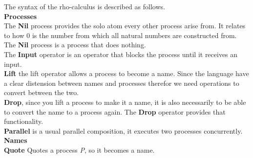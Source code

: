 The syntax of the rho-calculus is described as follows.\\





\textbf{Processes}\\ %
The \textbf{Nil} process provides the solo atom every other process arise from. It relates to how 0 is the number from which all natural numbers are constructed from. The \textbf{Nil} process is a process that does nothing.\\
The \textbf{Input} operator is an operator that blocks the process until it receives an input.\\
\textbf{Lift} the lift operator allows a process to become a name. Since the language have a clear distension between names and processes therefor we need operations to convert between the two.\\
\textbf{Drop}, since you lift a process to make it a name, it is also necessarily to be able to convert the name to a process again. The \textbf{Drop} operator provides that functionality. \\
\textbf{Parallel} is a usual parallel composition, it executes two processes concurrently.\\

\textbf{Names}\\ %
\textbf{Quote} Quotes a process \textit{P}, so it becomes a name. %